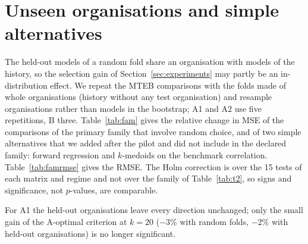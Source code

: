 \section{Unseen organisations and simple alternatives}
\label{app:fam}
The held-out models of a random fold share an organisation with models of the history, so the selection gain of Section~\ref{sec:experiments} may partly be an in-distribution effect.
We repeat the MTEB comparisons with the folds made of whole organisations (history without any test organisation) and resample organisations rather than models in the bootstrap; A1 and A2 use five repetitions, B three.
Table~\ref{tab:fam} gives the relative change in MSE of the comparisons of the primary family that involve random choice, and of two simple alternatives that we added after the pilot and did not include in the declared family: forward regression and $k$-medoids on the benchmark correlation.
Table~\ref{tab:famrmse} gives the RMSE.
The Holm correction is over the 15 tests of each matrix and regime and not over the family of Table~\ref{tab:t2}, so signs and significance, not $p$-values, are comparable.
\begin{table}[h]
\centering\scriptsize\setlength{\tabcolsep}{3pt}

\caption{Relative change in held-out MSE (\%) at $k=3$, $8$, $20$, first named minus second (negative: first is better), by organisation bootstrap; \textbf{bold}: Holm-adjusted $p<0.05$ over 15 tests. compl.\,$\dagger$: complement-error greedy; each change is divided by the mean MSE of the second selector in the full sample, so an interval end below $-100\%$ is possible and is not an error reduced by more than all of it. The last two comparisons are exploratory. On A2 with held-out organisations the scale is an MSE dominated by one organisation, so the large magnitudes of that row ($-77$, $-79$) mark the tail rather than an effect. $^\ddagger$ The organisation \texttt{codefuse-ai} (8 models, 64\% of the mean-predictor MSE under held-out folds) removed after the fact. Intervals: \texttt{code/results/FAM/TABLES.md}.}
\label{tab:fam}
\end{table}
\begin{table}[h]
\centering\scriptsize\setlength{\tabcolsep}{3pt}

\caption{RMSE in standardised units at $k=3$, $8$, $20$ with factor inference, random folds and folds of held-out organisations; compl.\,$\dagger$: complement-error greedy; $\ddagger$ as in Table~\ref{tab:fam}.}
\label{tab:famrmse}
\end{table}
For A1 the held-out organisations leave every direction unchanged; only the small gain of the A-optimal criterion at $k=20$ ($-3\%$ with random folds, $-2\%$ with held-out organisations) is no longer significant.
